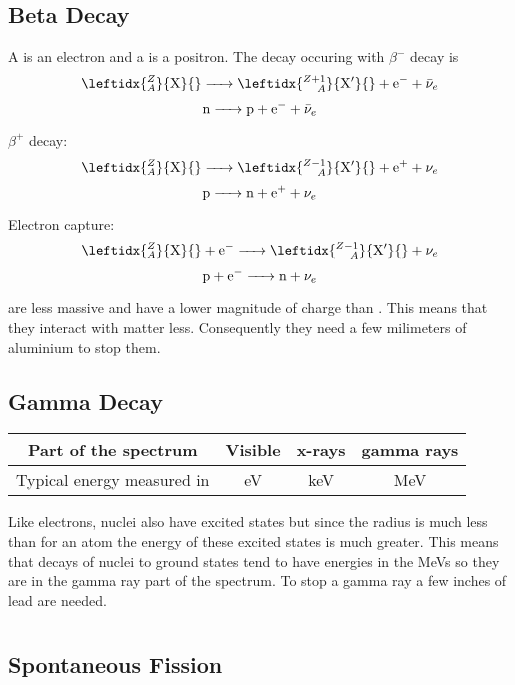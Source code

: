 \subsection*{Beta Decay}

A \bmparticle is an electron and a \bmparticle is a positron. The decay occuring with \(\beta^-\) decay is
\[\leftidx{^Z_A}{\mathrm{X}}{}\ce{->}\leftidx{_{\hphantom{{}+1}A}^{Z+1}}{\mathrm{X}'}{}+\electron+\antineutrino[e]\]
\[\neutron\ce{->}\proton+\electron+\antineutrino[e]\]

\(\beta^+\) decay:
\[\leftidx{^Z_A}{\mathrm{X}}{}\ce{->}\leftidx{_{\hphantom{{}-1}A}^{Z-1}}{\mathrm{X}'}{}+\positron+\neutrino[e]\]
\[\proton\ce{->}\neutron+\positron+\neutrino[e]\]

Electron capture:
\[\leftidx{^Z_A}{\mathrm{X}}{}+\electron\ce{->}\leftidx{^{Z-1}_{\hphantom{{}-1}A}}{\mathrm{X}'}{}+\neutrino[e]\]
\[\proton+\electron\ce{->}\neutron+\neutrino[e]\]

\bparticles are less massive and have a lower magnitude of charge than \aparticles. This means that they interact with matter less. Consequently they need a few milimeters of aluminium to stop them.

\subsection*{Gamma Decay}

\begin{center}
\begin{tabular}{c|ccc}
Part of the spectrum & Visible & x-rays & gamma rays\\\hline
Typical energy measured in & \si{eV}& \si{keV} & \si{MeV}
\end{tabular}
\end{center}

Like electrons, nuclei also have excited states but since the radius is much less than for an atom the energy of these excited states is much greater. This means that decays of nuclei to ground states tend to have energies in the \si{MeV}s so they are in the gamma ray part of the spectrum. To stop a gamma ray a few inches of lead are needed.

\section{}

\subsection*{Spontaneous Fission}

